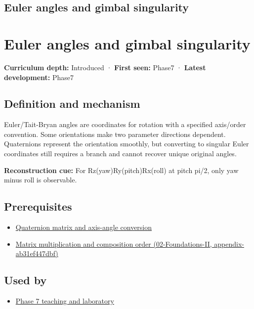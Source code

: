 \hypertarget{appendix-5f723fbd0593}{}
\section*{Euler angles and gimbal singularity}
\chapter{Euler angles and gimbal singularity}\label{appendix-5f723fbd0593-euler-angles-and-gimbal-singularity}

\textbf{Curriculum depth:} Introduced · \textbf{First seen:} Phase7 · \textbf{Latest development:} Phase7

\section{Definition and mechanism}\label{appendix-5f723fbd0593-definition-and-mechanism}

Euler/Tait-Bryan angles are coordinates for rotation with a specified axis/order convention. Some orientations make two parameter directions dependent. Quaternions represent the orientation smoothly, but converting to singular Euler coordinates still requires a branch and cannot recover unique original angles.

\textbf{Reconstruction cue:} For Rz(yaw)Ry(pitch)Rx(roll) at pitch pi/2, only yaw minus roll is observable.

\section{Prerequisites}\label{appendix-5f723fbd0593-prerequisites}

\begin{itemize}
\tightlist
\item
  \hyperref[appendix-26d8da71f6c4]{Quaternion matrix and axis-angle conversion}
\item
  \href{../02-Foundations-II/main.pdf\#nameddest=appendix-ab31ef447dbf}{Matrix multiplication and composition order (02-Foundations-II, appendix-ab31ef447dbf)}
\end{itemize}

\section{Used by}\label{appendix-5f723fbd0593-used-by}

\begin{itemize}
\tightlist
\item
  \href{Continuous\%20Notes/Computing\%20Foundations\%20-\%20From\%20Bits\%20to\%20C++\%20and\%20Systems\%20APIs\#Keep\%20the\%20promises\%20visible\%20while\%20moving\%20between\%20representations}{Phase 7 teaching and laboratory}
\end{itemize}

